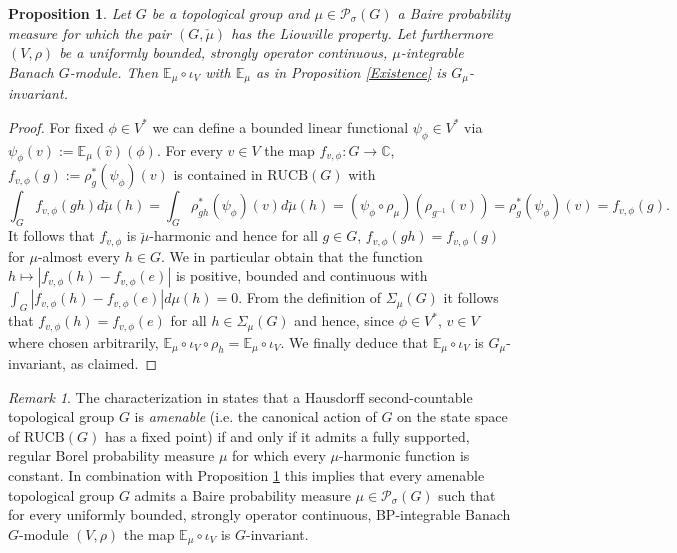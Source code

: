 \documentclass[a4paper,11pt,reqno]{amsart}
\numberwithin{equation}{section}
\newtheorem{proposition}[theorem]{Proposition}
\theoremstyle{definition}
\theoremstyle{remark}
\theoremstyle{remark}
\newtheorem{remark}[theorem]{Remark}
\begin{document}
\begin{proposition} \label{LiouvilleFixedPoint} Let $G$ be a topological group and $\mu\in\mathcal{P}_{\sigma}(G)$ a Baire probability measure for which the pair $(G,\check{\mu})$ has the Liouville property. Let furthermore $(V,\rho)$ be a uniformly bounded, strongly operator continuous, $\mu$-integrable Banach $G$-module. Then $\mathbb{E}_{\mu}\circ\iota_{V}$ with $\mathbb{E}_{\mu}$ as in Proposition \ref{Existence} is $G_{\mu}$-invariant. \end{proposition}

\begin{proof} For fixed $\phi\in V^{\ast}$ we can define a bounded linear functional $\psi_{\phi}\in V^{\ast}$ via $\psi_{\phi}(v):=\mathbb{E}_{\mu}(\widehat{v})(\phi)$. For every $v\in V$ the map $f_{v,\phi}:G\rightarrow\mathbb{C}$, $f_{v,\phi}(g):=\rho_{g}^{\ast}(\psi_{\phi})(v)$ is contained in $\text{RUCB}(G)$ with 
\[
\int_{G}f_{v,\phi}(gh)d\breve{\mu}(h)=\int_{G}\rho_{gh}^{\ast}(\psi_{\phi})(v)d\breve{\mu}(h)=(\psi_{\phi}\circ\rho_{\mu})\left(\rho_{g^{-1}}(v)\right)=\rho_{g}^{\ast}(\psi_{\phi})(v)=f_{v,\phi}(g).
\]
It follows that $f_{v,\phi}$ is $\breve{\mu}$-harmonic and hence for all $g\in G$, $f_{v,\phi}(gh)=f_{v,\phi}(g)$ for $\mu$-almost every $h\in G$. We in particular obtain that the function $h\mapsto|f_{v,\phi}(h)-f_{v,\phi}(e)|$ is positive, bounded and continuous with $\int_{G}|f_{v,\phi}(h)-f_{v,\phi}(e)|d\mu(h)=0$. From the definition of $\Sigma_{\mu}(G)$ it follows that $f_{v,\phi}(h)=f_{v,\phi}(e)$ for all $h\in\Sigma_{\mu}(G)$ and hence, since $\phi\in V^{\ast}$, $v\in V$ where chosen arbitrarily, $\mathbb{E}_{\mu}\circ\iota_{V}\circ\rho_{h}=\mathbb{E}_{\mu}\circ\iota_{V}$. We finally deduce that $\mathbb{E}_{\mu}\circ\iota_{V}$ is $G_{\mu}$-invariant, as claimed. \end{proof}

\begin{remark} \label{LiouvilleRemark} The characterization in \cite[Corollary 4.8]{SchneiderThom} states that a Hausdorff second-countable topological group $G$ is \emph{amenable} (i.e. the canonical action of $G$ on the state space of $\text{RUCB}(G)$ has a fixed point) if and only if it admits a fully supported, regular Borel probability measure $\mu$ for which every $\mu$-harmonic function is constant. In combination with Proposition \ref{LiouvilleFixedPoint} this implies that every amenable topological group $G$ admits a Baire probability measure $\mu\in\mathcal{P}_{\sigma}(G)$ such that for every uniformly bounded, strongly operator continuous, BP-integrable Banach $G$-module $(V,\rho)$ the map $\mathbb{E}_{\mu}\circ\iota_{V}$ is $G$-invariant. \end{remark}
\end{document}
